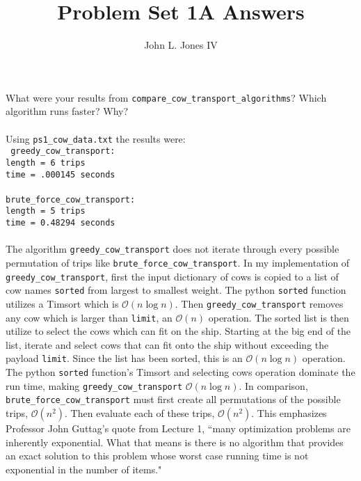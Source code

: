 \documentclass[letterpaper,11pt]{article}
\begin{document}
\title{Problem Set 1A Answers}
\author{John L. Jones IV}
\maketitle
\pagebreak

\section{}
What were your results from \texttt{compare\_cow\_transport\_algorithms}? Which algorithm runs faster? Why? \\
\\
Using \texttt{ps1\_cow\_data.txt} the results were: \\
\texttt{
  greedy\_cow\_transport:\\
  length =  6 trips \\
  time = .000145 seconds \\
  \\
  brute\_force\_cow\_transport: \\
  length =  5 trips \\
  time = 0.48294 seconds \\
}
\\
The algorithm \texttt{greedy\_cow\_transport} does not iterate through every possible permutation of trips
like \texttt{brute\_force\_cow\_transport}.
In my implementation of \texttt{greedy\_cow\_transport}, first the input dictionary of cows is copied to a 
list of cow names \texttt{sorted} from largest to smallest weight. 
The python \texttt{sorted} function utilizes a Timsort which is $\mathcal{O}(n\log{}n)$.
Then \texttt{greedy\_cow\_transport} removes any cow which is larger than \texttt{limit},
an $\mathcal{O}(n)$ operation. 
The sorted list is then utilize to select the cows which can fit on the ship.
Starting at the big end of the list,
iterate and select cows that can fit onto the ship without exceeding the payload \texttt{limit}.
Since the list has been sorted, this is an $\mathcal{O}(n\log{}n)$ operation.
The python \texttt{sorted} function's Timsort and 
selecting cows operation dominate the run time,
making \texttt{greedy\_cow\_transport} $\mathcal{O}(n\log{}n)$.
In comparison, \texttt{brute\_force\_cow\_transport} must first create all permutations of the possible trips, 
$\mathcal{O}(n^{2})$.
Then evaluate each of these trips, $\mathcal{O}(n^{2})$.
This emphasizes Professor John Guttag's quote from Lecture 1, ``many optimization problems are inherently exponential.
What that means is there is no algorithm that provides an exact solution to this problem whose worst case running time
is not exponential in the number of items."
\end{document}
